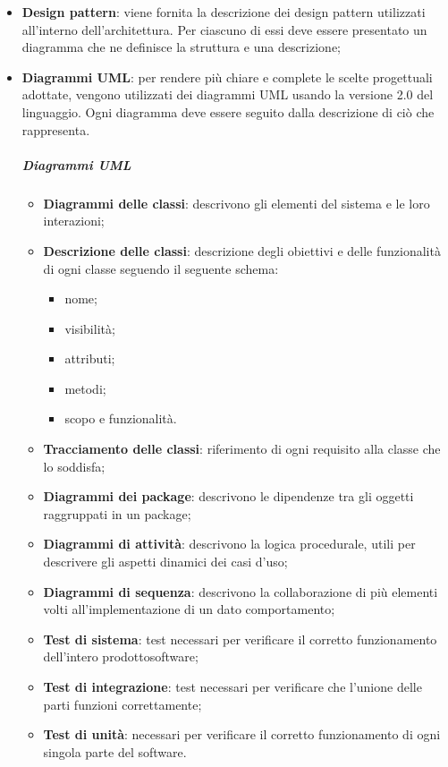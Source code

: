 \begin{itemize}
	\item \textbf{Design pattern}: viene fornita la descrizione dei design pattern utilizzati all'interno dell'architettura. Per ciascuno di essi deve essere presentato un diagramma che ne definisce la struttura e una descrizione;
	\item \textbf{Diagrammi UML}: per rendere più chiare e complete le scelte progettuali adottate, vengono utilizzati dei diagrammi UML usando la versione 2.0 del linguaggio. Ogni diagramma deve essere seguito dalla descrizione di ciò che rappresenta.
	\subparagraph*{Diagrammi UML}
	\begin{itemize}
		\item \textbf{Diagrammi delle classi}: descrivono gli elementi del sistema e le loro interazioni;
		\item \textbf{Descrizione delle classi}: descrizione degli obiettivi e delle funzionalità di ogni classe seguendo il seguente schema:
		\begin{itemize}
			\item nome;
			\item visibilità;
			\item attributi;
			\item metodi;
			\item scopo e funzionalità.
		\end{itemize}
		\item \textbf{Tracciamento delle classi}: riferimento di ogni requisito alla classe che lo soddisfa;
		\item \textbf{Diagrammi dei package}: descrivono le dipendenze tra gli oggetti raggruppati in un package;
		\item \textbf{Diagrammi di attività}: descrivono la logica procedurale, utili per descrivere gli aspetti dinamici dei casi d'uso\glo;
		\item \textbf{Diagrammi di sequenza}: descrivono la collaborazione di più elementi volti all'implementazione di un dato comportamento;
		\item \textbf{Test di sistema}: test necessari per verificare il corretto funzionamento dell'intero prodotto\glosp software;
		\item \textbf{Test di integrazione}: test necessari per verificare che l'unione delle parti funzioni correttamente;
		\item \textbf{Test di unità}: necessari per verificare il corretto funzionamento di ogni singola parte del software.
	\end{itemize}
\end{itemize}

